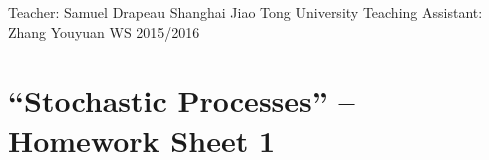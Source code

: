 \documentclass[DIV=classic,a4paper,10pt]{scrartcl}
\theoremstyle{nonumberplain}
\numberwithin{equation}{section}
\begin{document}
\noindent
Teacher: Samuel Drapeau \hfill Shanghai Jiao Tong University \newline
Teaching Assistant: Zhang Youyuan \hfill WS 2015/2016

\smallskip
\noindent
\hrulefill

\smallskip

\setcounter{section}{1}

\pagestyle{empty}


\section*{``Stochastic Processes'' -- Homework Sheet 1}
\thispagestyle{empty}


\end{document}
